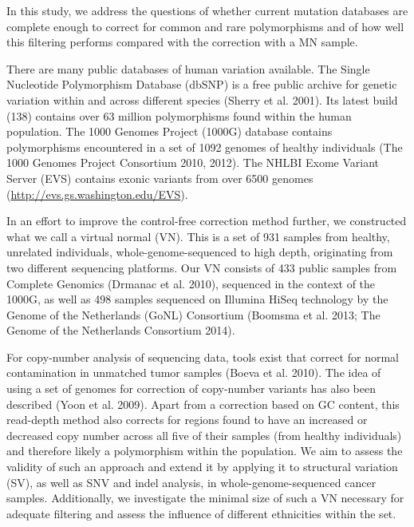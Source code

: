 In this study, we address the questions of whether current mutation databases are complete enough to correct for common and rare polymorphisms and of how well this filtering performs compared with the correction with a MN sample.

There are many public databases of human variation available. The Single Nucleotide Polymorphism Database (dbSNP) is a free public archive for genetic variation within and across different species (Sherry et al. 2001). Its latest build (138) contains over 63 million polymorphisms found within the human population. The 1000 Genomes Project (1000G) database contains polymorphisms encountered in a set of 1092 genomes of healthy individuals (The 1000 Genomes Project Consortium 2010, 2012). The NHLBI Exome Variant Server (EVS) contains exonic variants from over 6500 genomes (\url{http://evs.gs.washington.edu/EVS}).

In an effort to improve the control-free correction method further, we constructed what we call a virtual normal (VN). This is a set of 931 samples from healthy, unrelated individuals, whole-genome-sequenced to high depth, originating from two different sequencing platforms. Our VN consists of 433 public samples from Complete Genomics (Drmanac et al. 2010), sequenced in the context of the 1000G, as well as 498 samples sequenced on Illumina HiSeq technology by the Genome of the Netherlands (GoNL) Consortium (Boomsma et al. 2013; The Genome of the Netherlands Consortium 2014).

For copy-number analysis of sequencing data, tools exist that correct for normal contamination in unmatched tumor samples (Boeva et al. 2010). The idea of using a set of genomes for correction of copy-number variants has also been described (Yoon et al. 2009). Apart from a correction based on GC content, this read-depth method also corrects for regions found to have an increased or decreased copy number across all five of their samples (from healthy individuals) and therefore likely a polymorphism within the population. We aim to assess the validity of such an approach and extend it by applying it to structural variation (SV), as well as SNV and indel analysis, in whole-genome-sequenced cancer samples. Additionally, we investigate the minimal size of such a VN necessary for adequate filtering and assess the influence of different ethnicities within the set.

